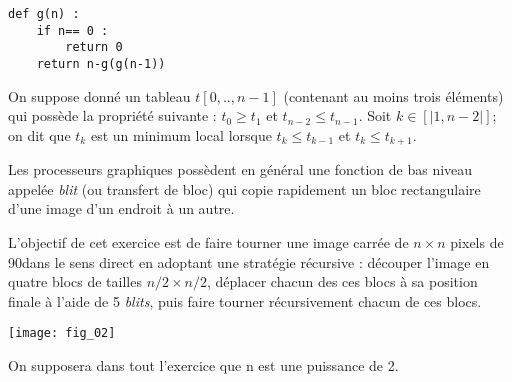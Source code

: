 \begin{multicols}{2}
\begin{py}
\begin{lstlisting}
def g(n) :
    if n== 0 : 
        return 0
    return n-g(g(n-1))
\end{lstlisting}
\end{py}


\exer{}
\setcounter{numques}{0}

On suppose donné un tableau $t[0,.., n-1]$ (contenant au moins trois éléments) qui possède la propriété suivante : $t_0\geq t_1$ et $t_{n-2}\leq t_{n-1}$. Soit $k\in[|1,n-2|]$; on dit que $t_k$ est un minimum local lorsque $t_k\leq t_{k-1}$ et $t_k\leq t_{k+1}$.



\exer{}
\setcounter{numques}{0}

Les processeurs graphiques possèdent en général une fonction de bas niveau appelée \textit{blit} (ou transfert de bloc) qui copie rapidement un bloc rectangulaire d’une image d’un endroit à un autre.

L’objectif de cet exercice est de faire tourner une image carrée de $n\times n$ pixels de 90\textdegree dans le sens direct en
adoptant une stratégie récursive : découper l’image en quatre blocs de tailles $n/2 \times n/2$, déplacer chacun des ces
blocs à sa position finale à l’aide de 5 \textit{blits}, puis faire tourner récursivement chacun de ces blocs.

\begin{center}
\texttt{[image: fig\_02]}
\end{center}

On supposera dans tout l’exercice que n est une puissance de 2.







\end{multicols}
